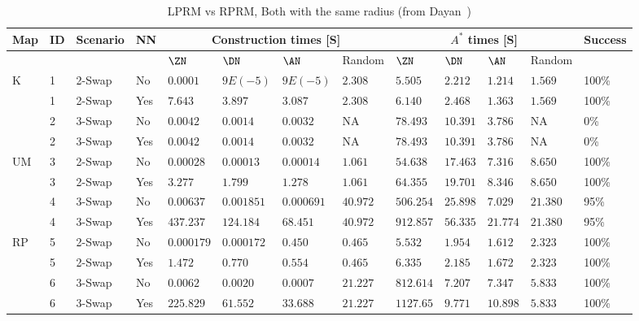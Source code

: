 \begin{table*}[t]
\centering
\caption{LPRM vs RPRM, Both with the same radius (from Dayan~\cite{dayan2023near})}
\begin{tabularx}{\linewidth}{|X|X|X|X||X|X|X|X|X|X|X|X|X|} \hline
 Map & ID & Scenario & NN &
 \multicolumn{4}{|c|}{Construction times [S]} &
 \multicolumn{4}{|c|}{$A^*$ times [S]} &
  Success
 \\
 \hline
 & & & & $\ZN$ & $\DN$ & $\AN$ & Random & $\ZN$ & $\DN$ & $\AN$ & Random & \\
 \hline
 \multirow{4}{*}{K}
  & 1 & 2-Swap & No  & $0.0001$    &$9E(-5)$&   $9E(-5)$ & $2.308$ & $5.505$ & $2.212$ & \cellcolor{green} $1.214$ & \cellcolor{pink} $1.569$ & 100\%\\
  \cline{2-13}
  & 1 & 2-Swap & Yes  & $7.643$    &$3.897$&   $3.087$ & $2.308$ & $6.140$ & $2.468$ & \cellcolor{green}$1.363$ & \cellcolor{pink}$1.569$ & 100\%\\
  \cline{2-13}
  & 2& 3-Swap   & No & $0.0042$    &$0.0014$&   $0.0032$ & NA & $78.493$ & $10.391$ &\cellcolor{green} $3.786$ & \cellcolor{pink}NA & 0\% \\
    \cline{2-13}
  & 2& 3-Swap   & Yes & $0.0042$    &$0.0014$&   $0.0032$ & NA & $78.493$ & $10.391$ &\cellcolor{green} $3.786$ & \cellcolor{pink}NA & 0\% \\
 \hline
  \multirow{4}{*}{UM}
  & 3 & 2-Swap  & No & $0.00028$    &$0.00013$&   $0.00014$ & $1.061$ & $54.638$ & $17.463$ & \cellcolor{green}$7.316$ & \cellcolor{pink}$8.650$ & 100\% \\
  \cline{2-13}
    & 3 & 2-Swap  & Yes & $3.277$    &$1.799$&   $1.278$ & $1.061$ & $64.355$ & $19.701$ &\cellcolor{green} $8.346$ & \cellcolor{pink}$8.650$ & 100\% \\
  \cline{2-13}
  & 4& 3-Swap  & No & $0.00637$    &$0.001851$&   $0.000691$ & $40.972$ & $506.254$ & $25.898$ &\cellcolor{green} $7.029$ & \cellcolor{pink}$21.380$ & 95\% \\
    \cline{2-13}
    & 4& 3-Swap  & Yes & $437.237$    &$124.184$&   $68.451$ & $40.972$ & $912.857$ & $56.335$ & \cellcolor{pink}$21.774$ & \cellcolor{green}$21.380$ & 95\% \\
 \hline
 \multirow{4}{*}{RP}
  & 5& 2-Swap  & No & $0.000179$    &$0.000172$&   $0.450$ & $0.465$ & $5.532$ & $1.954$ & \cellcolor{green}$1.612$ & \cellcolor{pink}$2.323$ & 100\%\\
  \cline{2-13}
    & 5& 2-Swap  & Yes & $1.472$    &$0.770$&   $0.554$ & $0.465$ & $6.335$ & $2.185$ & \cellcolor{green}$1.672$ & \cellcolor{pink}$2.323$ & 100\%\\
  \cline{2-13}
  & 6 & 3-Swap  & No & $0.0062$    &$0.0020$&   $0.0007$ & $21.227$ & $812.614$ & $7.207$ & \cellcolor{pink}$7.347$ & \cellcolor{green}$5.833$ & 100\%\\
    \cline{2-13}
  & 6 & 3-Swap  & Yes & $225.829$    &$61.552$&   $33.688$ & $21.227$ & $1127.65$ & $9.771$ & \cellcolor{pink}$10.898$ & \cellcolor{green}$5.833$ & 100\%\\
 \hline
\end{tabularx}
\end{table*}

